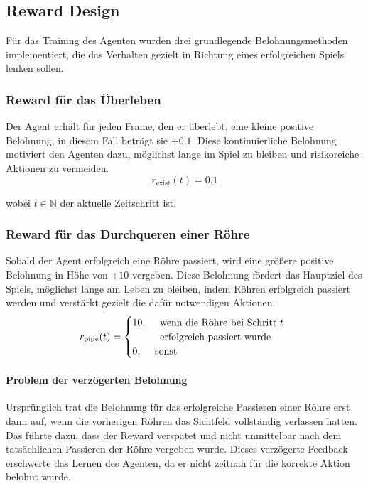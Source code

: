 \documentclass[conference]{IEEEtran}
\begin{document}
\subsection{Reward Design}\label{reward_design}
Für das Training des Agenten wurden drei grundlegende Belohnungsmethoden implementiert, die das Verhalten gezielt in Richtung eines erfolgreichen Spiels lenken sollen.\\

\subsubsection{Reward für das Überleben}\label{reward_design_first}
Der Agent erhält für jeden Frame, den er überlebt, eine kleine positive Belohnung, in diesem Fall beträgt sie \( +0{.}1 \). Diese kontinuierliche Belohnung motiviert den Agenten dazu, möglichst lange im Spiel zu bleiben und risikoreiche Aktionen zu vermeiden.
\begin{equation}
	r_{\text{exist}}(t) = 0{.}1
\end{equation}

wobei \( t \in \mathbb{N} \) der aktuelle Zeitschritt ist.\\

\subsubsection{Reward für das Durchqueren einer Röhre}\label{reward_design_second}
Sobald der Agent erfolgreich eine Röhre passiert, wird eine größere positive Belohnung in Höhe von \( +10 \) vergeben. Diese Belohnung fördert das Hauptziel des Spiels, möglichst lange am Leben zu bleiben, indem Röhren erfolgreich passiert werden und verstärkt gezielt die dafür notwendigen Aktionen.
\begin{equation}
	r_{\text{pipe}}(t) =
	\begin{cases}
		10, & \begin{array}[t]{l}
			\text{wenn die Röhre bei Schritt } t \\
			\text{erfolgreich passiert wurde}
		\end{array} \\
		0, & \text{sonst}
	\end{cases}
\end{equation}

\paragraph{Problem der verzögerten Belohnung}
Ursprünglich trat die Belohnung für das erfolgreiche Passieren einer Röhre erst dann auf, wenn die vorherigen Röhren das Sichtfeld vollständig verlassen hatten. Das führte dazu, dass der Reward verspätet und nicht unmittelbar nach dem tatsächlichen Passieren der Röhre vergeben wurde. Dieses verzögerte Feedback erschwerte das Lernen des Agenten, da er nicht zeitnah für die korrekte Aktion belohnt wurde.
\end{document}
